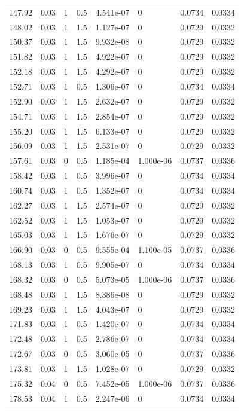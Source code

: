 \documentclass[preview]{standalone}
\begin{document}
{{{\begin{tabular}{L{1.2cm}C{1.2cm} C{0.3cm}C{0.5cm} C{1.4cm}C{1.4cm} C{1.4cm}C{1.4cm}}
  147.92  &  0.03  & 1     & 0.5 &  4.541e-07  & 0  & 0.0734 &  0.0334   \\ 
  148.02  &  0.03  & 1     & 1.5 &  1.127e-07  & 0  & 0.0729 &  0.0332   \\ 
  150.37  &  0.03  & 1     & 1.5 &  9.932e-08  & 0  & 0.0729 &  0.0332   \\ 
  151.82  &  0.03  & 1     & 1.5 &  4.922e-07  & 0  & 0.0729 &  0.0332   \\ 
  152.18  &  0.03  & 1     & 1.5 &  4.292e-07  & 0  & 0.0729 &  0.0332   \\ 
  152.71  &  0.03  & 1     & 0.5 &  1.306e-07  & 0  & 0.0734 &  0.0334   \\ 
  152.90  &  0.03  & 1     & 1.5 &  2.632e-07  & 0  & 0.0729 &  0.0332   \\ 
  154.71  &  0.03  & 1     & 1.5 &  2.854e-07  & 0  & 0.0729 &  0.0332   \\ 
  155.20  &  0.03  & 1     & 1.5 &  6.133e-07  & 0  & 0.0729 &  0.0332   \\ 
  156.09  &  0.03  & 1     & 1.5 &  2.531e-07  & 0  & 0.0729 &  0.0332   \\ 
  157.61  &  0.03  & 0     & 0.5 &  1.185e-04  & 1.000e-06  & 0.0737 &  0.0336   \\ 
  158.42  &  0.03  & 1     & 0.5 &  3.996e-07  & 0  & 0.0734 &  0.0334   \\ 
  160.74  &  0.03  & 1     & 0.5 &  1.352e-07  & 0  & 0.0734 &  0.0334   \\ 
  162.27  &  0.03  & 1     & 1.5 &  2.574e-07  & 0  & 0.0729 &  0.0332   \\ 
  162.52  &  0.03  & 1     & 1.5 &  1.053e-07  & 0  & 0.0729 &  0.0332   \\ 
  165.03  &  0.03  & 1     & 1.5 &  1.676e-07  & 0  & 0.0729 &  0.0332   \\ 
  166.90  &  0.03  & 0     & 0.5 &  9.555e-04  & 1.100e-05  & 0.0737 &  0.0336   \\ 
  168.13  &  0.03  & 1     & 0.5 &  9.905e-07  & 0  & 0.0734 &  0.0334   \\ 
  168.32  &  0.03  & 0     & 0.5 &  5.073e-05  & 1.000e-06  & 0.0737 &  0.0336   \\ 
  168.48  &  0.03  & 1     & 1.5 &  8.386e-08  & 0  & 0.0729 &  0.0332   \\ 
  169.23  &  0.03  & 1     & 1.5 &  4.043e-07  & 0  & 0.0729 &  0.0332   \\ 
  171.83  &  0.03  & 1     & 0.5 &  1.420e-07  & 0  & 0.0734 &  0.0334   \\ 
  172.48  &  0.03  & 1     & 0.5 &  2.786e-07  & 0  & 0.0734 &  0.0334   \\ 
  172.67  &  0.03  & 0     & 0.5 &  3.060e-05  & 0  & 0.0737 &  0.0336   \\ 
  173.81  &  0.03  & 1     & 1.5 &  1.028e-07  & 0  & 0.0729 &  0.0332   \\ 
  175.32  &  0.04  & 0     & 0.5 &  7.452e-05  & 1.000e-06  & 0.0737 &  0.0336   \\ 
  178.53  &  0.04  & 1     & 0.5 &  2.247e-06  & 0  & 0.0734 &  0.0334   \\ 
\hline 
\end{tabular} 

}}}
\end{document}
